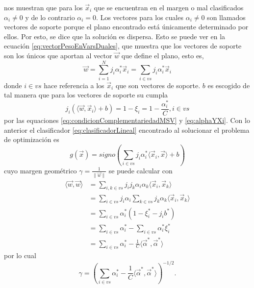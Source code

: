 \documentclass[letterpaper,12pt]{book}
\begin{document}
nos muestran que para los $\vec{x}_i$ que se encuentran en el margen o mal clasificados $\alpha_i\neq 0$ y de lo contrario $\alpha_i = 0$. Los vectores para los cuales $\alpha_i\neq 0$ son llamados vectores de soporte porque el plano encontrado está únicamente determinado por ellos. Por esto, se dice que la solución es dispersa. Esto se puede ver en la ecuación \ref{eq:vectorPesoEnVarsDuales}, que muestra que los vectores de soporte son los únicos que aportan al vector $\vec{w}$ que define el plano, esto es, 
\begin{equation}
\vec{w} = \sum_{i=1}^{N}j_i\alpha_i^*\vec{x}_i = \sum_{i\in vs}j_i\alpha_i^*\vec{x}_i
\end{equation}
donde $i\in vs$ hace referencia a los $\vec{x}_i$ que son vectores de soporte. $b$ es escogido de tal manera que para los vectores de soporte su cumpla  
\begin{equation}\label{eq:eleccionb}
  j_i(\langle\vec{w},\vec{x}_i\rangle+b) = 1-\xi_i = 1-\frac{\alpha_i^*}{C}, i\in vs
\end{equation}
por las equaciones \ref{eq:condicionComplementariedadMSV} y \ref{eq:alphaYXi}. Con lo anterior el clasificador \ref{eq:clasificadorLineal} encontrado al solucionar el problema de optimización es 
\begin{equation}\label{eq:clasificadorMargenMaximal}
g(\vec{x}) = signo\left(\sum_{i\in vs}j_i\alpha^*_i\langle\vec{x}_i,\vec{x}\rangle + b \right)
\end{equation}
cuyo margen geométrico $\gamma = \frac{1}{\| \vec{w} \|}$ se puede calcular con
\begin{equation}
  \begin{aligned}
    \langle\vec{w},\vec{w}\rangle &= \sum_{i,k\in vs}j_ij_k\alpha_i\alpha_k\langle\vec{x}_i,\vec{x}_k\rangle\\
    &= \sum_{i\in vs}j_i\alpha_i\sum_{k\in vs}j_k\alpha_k\langle\vec{x}_i,\vec{x}_k\rangle\\
    &= \sum_{i\in vs}\alpha_{i}^{*}(1-\xi_i^*-j_ib^*)\\
    &=  \sum_{i\in vs}\alpha_i^*-\sum_{i\in vs}\alpha^*_i\xi_i^*\\
    &= \sum_{i\in vs}\alpha_i^*-\frac{1}{C}\langle\vec{\alpha}^*,\vec{\alpha}^*\rangle
  \end{aligned}
\end{equation} 
por lo cual 
\begin{equation}\label{eq:margenGeometrico}
\gamma = \left(\sum_{i\in vs}\alpha_i^*-\frac{1}{C}\langle\vec{\alpha}^*,\vec{\alpha}^*\rangle\right)^{-1/2}.
\end{equation}
\end{document}
